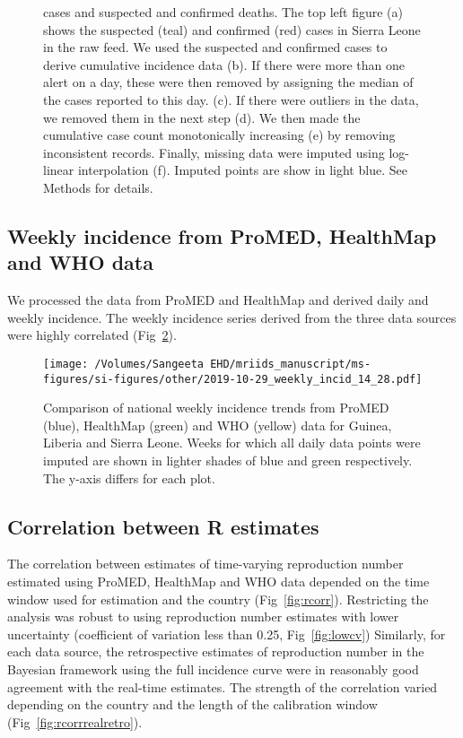 \documentclass[9pt,twoside,lineno]{pnas-new}
\begin{document}
\begin{figure}
{    cases and suspected and confirmed
    deaths. The top left figure (a) shows the suspected (teal) and
    confirmed (red) cases in Sierra Leone in the raw feed.
    We used the suspected and confirmed cases to derive cumulative
    incidence data (b). If there were more than one alert on a day, 
    these were then removed
    by assigning the median of the cases reported to this day.
    (c).
    If there were outliers in the data, we removed them in the next step (d).
    We then made the cumulative case count monotonically increasing (e) by
    removing inconsistent records. Finally, missing data were imputed using
    log-linear interpolation (f). Imputed points are show in light blue.
    See Methods for details.}
\label{fig:dataclean}
\end{figure}\FloatBarrier

\subsection{Weekly incidence from ProMED, HealthMap and WHO data}

We processed the data from ProMED and HealthMap and derived daily and
weekly incidence. The weekly incidence series derived from the three
data sources were highly correlated (Fig~\ref{fig:weekly}).

\begin{figure}
  \centering
  \texttt{[image: /Volumes/Sangeeta EHD/mriids\_manuscript/ms-figures/si-figures/other/2019-10-29\_weekly\_incid\_14\_28.pdf]}
  \caption{Comparison of national weekly incidence trends from ProMED (blue),
    HealthMap (green) and WHO (yellow) data for Guinea, Liberia and
    Sierra Leone. Weeks for which all daily data points were imputed
    are shown in lighter shades of blue and green respectively. The
y-axis differs for each plot.}
\label{fig:weekly}
\end{figure}\FloatBarrier


\subsection{Correlation between R estimates}\label{correlation-between-r-estimates}

The correlation between estimates of time-varying reproduction number 
estimated using ProMED, HealthMap and WHO data depended on the
time window used for estimation and the country
(Fig~\ref{fig:rcorr}). Restricting the analysis was robust to using
reproduction number estimates with lower uncertainty (coefficient of
variation less than 0.25, Fig~\ref{fig:lowcv})
Similarly, for each data source, the
retrospective estimates of reproduction number in the Bayesian
framework using the full incidence curve
were in reasonably good agreement with the real-time estimates.
The strength of the correlation varied depending on the country and
the length of the calibration window (Fig~\ref{fig:rcorrrealretro}).
\end{document}
